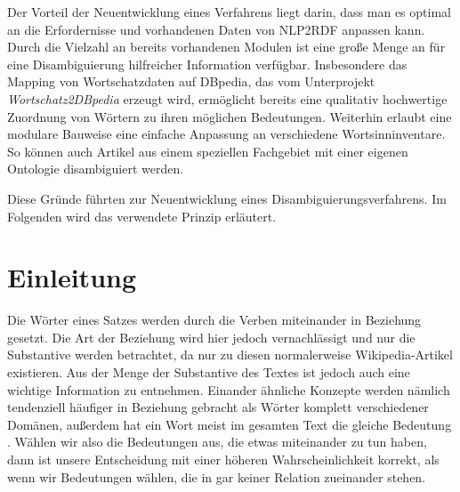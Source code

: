 Der Vorteil der Neuentwicklung eines Verfahrens liegt darin, dass man es optimal an die Erfordernisse und vorhandenen Daten von NLP2RDF anpassen kann.
Durch die Vielzahl an bereits vorhandenen Modulen ist eine große Menge an für eine Disambiguierung hilfreicher Information verfügbar.
Insbesondere das Mapping von Wortschatzdaten auf DBpedia, das vom Unterprojekt \emph{Wortschatz2DBpedia} erzeugt wird, ermöglicht bereits eine qualitativ hochwertige\footnotemark{} Zuordnung von Wörtern zu ihren möglichen Bedeutungen.
Weiterhin erlaubt eine modulare Bauweise eine einfache Anpassung an verschiedene Wortsinninventare. So können auch Artikel aus einem speziellen Fachgebiet mit einer eigenen Ontologie disambiguiert werden.

Diese Gründe führten zur Neuentwicklung eines Disambiguierungsverfahrens.
Im Folgenden wird das verwendete Prinzip erläutert.
\section{Einleitung}
Die Wörter eines Satzes werden durch die Verben miteinander in Beziehung gesetzt.
Die Art der Beziehung wird hier jedoch vernachlässigt und nur die Substantive werden betrachtet, da nur zu diesen normalerweise Wikipedia-Artikel existieren.\footnotemark{}
Aus der Menge der Substantive des Textes ist jedoch auch eine wichtige Information zu entnehmen.
Einander ähnliche Konzepte werden nämlich tendenziell häufiger in Beziehung gebracht als Wörter komplett verschiedener Domänen, außerdem hat ein Wort meist im gesamten Text die gleiche Bedeutung \citep{one_sense_per_discurse}.
Wählen wir also die Bedeutungen aus, die etwas miteinander zu tun haben, dann ist unsere Entscheidung mit einer höheren Wahrscheinlichkeit korrekt, als wenn wir Bedeutungen wählen, die in gar keiner Relation zueinander stehen.

